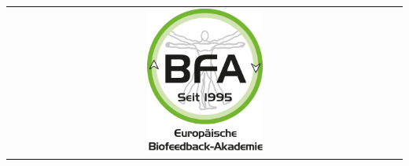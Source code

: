 \begin{center}
\begin{tabular}{ c c }
        \multicolumn{2}{c}{\includegraphics[width=0.3\textwidth]{tex/images/BFA.png}}     
    \end{tabular}
    \end{center}

\vfill

\newpage
